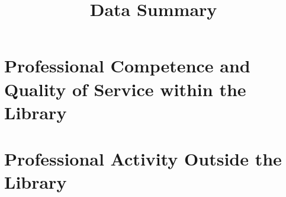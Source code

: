 \documentclass[12pt, oneside]{article}
\title{Data Summary}
\begin{document}
\date{}
\maketitle
\thispagestyle{fancy}



\section{Professional Competence and Quality of Service within the Library}




\section{Professional Activity Outside the Library}


\end{document}
